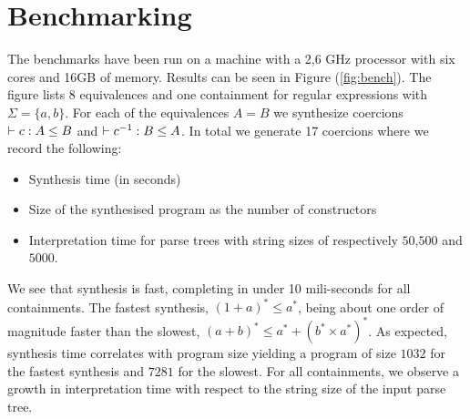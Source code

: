 \documentclass[a4paper,UKenglish,cleveref, autoref, thm-restate]{lipics-v2021}
\begin{document}
\section{Benchmarking}
The benchmarks have been run on a machine with a 2,6 GHz processor with six cores and 16GB of memory. Results can be seen in Figure (\ref{fig:bench}). The figure lists 8 equivalences and one containment for regular expressions with $\Sigma= \{a,b\}$. For each of the equivalences $A = B$ we synthesize coercions $\contains{}{c}{A}{B}$ and $\contains{}{\dslcominv{c}}{B}{A}$. In total we generate 17 coercions where we record the following:
\begin{itemize}
\item Synthesis time (in seconds)
\item Size of the synthesised program as the number of constructors 
\item Interpretation time for parse trees with string sizes of respectively $50$,$500$ and $5000$.
\end{itemize}
We see that synthesis is fast, completing in under 10 mili-seconds for all containments. The fastest synthesis, $(1 + a)^* \leq a^*$, being about one order of magnitude faster than the slowest, $(a + b)^* \leq a^* + (b^* \times a^*)^*$. As expected, synthesis time correlates with program size yielding a program of size $1032$ for the fastest synthesis and $7281$ for the slowest. For all containments, we observe a growth in interpretation time with respect to the string size of the input parse tree.
\end{document}
